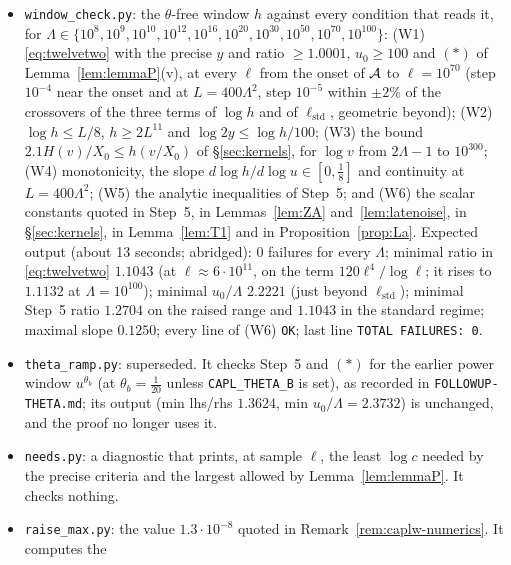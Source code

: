 \begin{itemize}
\begin{verbatim}
cells 20790 on [18.421, 60]: failures 0; max slope dlogH/dL = 2.94e-06
cells 398801 on [60, 2e4]: failures 0; max slope = 0.00e+00
\end{verbatim}
\endgroup
\item \texttt{window\_check.py}: the $\theta$-free window $h$ against every condition that reads it, for
$\Lambda\in\{10^8,10^9,10^{10},10^{12},10^{16},10^{20},10^{30},10^{50},10^{70},10^{100}\}$: (W1) \eqref{eq:twelvetwo} with the precise $y$ and
ratio $\ge1.0001$, $u_0\ge100$ and $(*)$ of Lemma~\ref{lem:lemmaP}(v), at every $\ell$ from the onset of $\mathcal{A}$ to $\ell=10^{70}$
(step $10^{-4}$ near the onset and at $L=400\Lambda^2$, step $10^{-5}$ within $\pm2\%$ of the crossovers of the three terms of $\log h$ and
of $\ell_{\mathrm{std}}$, geometric beyond); (W2) $\log h\le L/8$, $h\ge2L^{11}$ and $\log2y\le\log h/100$; (W3) the bound
$2.1H(v)/X_0\le h(v/X_0)$ of \S\ref{sec:kernels}, for $\log v$ from $2\Lambda-1$ to $10^{300}$; (W4) monotonicity, the slope
$d\log h/d\log u\in[0,\tfrac18]$ and continuity at $L=400\Lambda^2$; (W5) the analytic inequalities of Step~5; and (W6) the scalar
constants quoted in Step~5, in Lemmas~\ref{lem:ZA} and~\ref{lem:latenoise}, in \S\ref{sec:kernels}, in Lemma~\ref{lem:T1} and in
Proposition~\ref{prop:La}. Expected output (about 13 seconds; abridged): $0$ failures for every $\Lambda$; minimal ratio in
\eqref{eq:twelvetwo} $1.1043$ (at $\ell\approx6\cdot10^{11}$, on the term $120\ell^4/\log\ell$; it rises to $1.1132$ at $\Lambda=10^{100}$);
minimal $u_0/\Lambda$ $2.2221$ (just beyond $\ell_{\mathrm{std}}$); minimal Step~5 ratio $1.2704$ on the raised range and $1.1043$ in the
standard regime; maximal slope $0.1250$; every line of (W6) \texttt{OK}; last line \texttt{TOTAL FAILURES: 0}.
\item \texttt{theta\_ramp.py}: superseded. It checks Step~5 and $(*)$ for the earlier power window $u^{\theta_b}$ (at $\theta_b=\tfrac1{20}$
unless \texttt{CAPL\_THETA\_B} is set), as recorded in \texttt{FOLLOWUP-THETA.md}; its output (min lhs/rhs $1.3624$, min
$u_0/\Lambda=2.3732$) is unchanged, and the proof no longer uses it.
\item \texttt{needs.py}: a diagnostic that prints, at sample $\ell$, the least $\log c$ needed by the precise criteria and the largest
allowed by Lemma~\ref{lem:lemmaP}. It checks nothing.
\item \texttt{raise\_max.py}: the value $1.3\cdot10^{-8}$ quoted in Remark~\ref{rem:caplw-numerics}. It computes the

\end{itemize}
